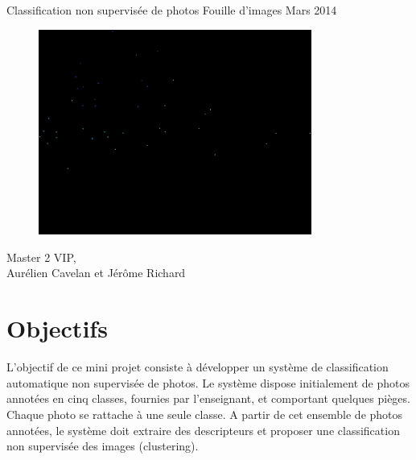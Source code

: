\documentclass[12pt,a4paper,utf8x]{report}
\begin{document}
\begin{titlepage}
\hfill
  \begin{center}
    \begin{minipage}[t]{12cm} 
    \huge \center Classification non supervisée de photos
    \huge \center Fouille d'images
    \huge \center Mars 2014
    \end{minipage}
  \end{center}
\vfill
\begin{figure}[!h]
      \centering            
      \includegraphics[width=0.8\textwidth]{ACP_SIFT.png} 
    \end{figure}
\begin{flushleft}
\begin{minipage}[t]{5cm}
Master 2 VIP, \\ Aurélien Cavelan et Jérôme Richard
\end{minipage}
\end{flushleft}

\end{titlepage}
\tableofcontents

\chapter{Objectifs}

L'objectif de ce mini projet consiste à développer un système de classification automatique non supervisée de photos. Le système dispose initialement de photos annotées en cinq classes, fournies par l'enseignant, et comportant quelques pièges. Chaque photo se rattache à une seule classe. A partir de cet ensemble de photos annotées, le système doit extraire des descripteurs et proposer une classification non supervisée des images (clustering).
\end{document}
